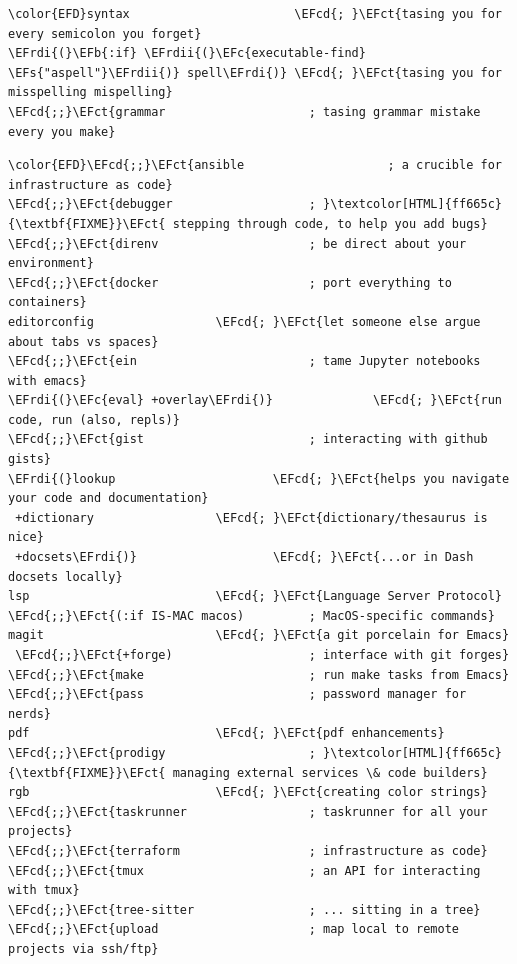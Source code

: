\documentclass{scrartcl}
\newcommand{\EFs}[1]{\textcolor{EFs}{#1}} %
\newcommand{\EFb}[1]{\textcolor{EFb}{#1}} %
\newcommand{\EFct}[1]{\textcolor{EFct}{#1}} %
\newcommand{\EFc}[1]{\textcolor{EFc}{#1}} %
\newcommand{\EFcd}[1]{\textcolor{EFcd}{#1}} %
\newcommand{\EFrdi}[1]{#1} %
\newcommand{\EFrdii}[1]{#1} %
\begin{document}
\begin{enumerate}
\begin{Code}
\begin{Verbatim}[]
\color{EFD}syntax                       \EFcd{; }\EFct{tasing you for every semicolon you forget}
\EFrdi{(}\EFb{:if} \EFrdii{(}\EFc{executable-find} \EFs{"aspell"}\EFrdii{)} spell\EFrdi{)} \EFcd{; }\EFct{tasing you for misspelling mispelling}
\EFcd{;;}\EFct{grammar                    ; tasing grammar mistake every you make}
\end{Verbatim}
\end{Code}

\begin{Code}
\begin{Verbatim}[]
\color{EFD}\EFcd{;;}\EFct{ansible                    ; a crucible for infrastructure as code}
\EFcd{;;}\EFct{debugger                   ; }\textcolor[HTML]{ff665c}{\textbf{FIXME}}\EFct{ stepping through code, to help you add bugs}
\EFcd{;;}\EFct{direnv                     ; be direct about your environment}
\EFcd{;;}\EFct{docker                     ; port everything to containers}
editorconfig                 \EFcd{; }\EFct{let someone else argue about tabs vs spaces}
\EFcd{;;}\EFct{ein                        ; tame Jupyter notebooks with emacs}
\EFrdi{(}\EFc{eval} +overlay\EFrdi{)}              \EFcd{; }\EFct{run code, run (also, repls)}
\EFcd{;;}\EFct{gist                       ; interacting with github gists}
\EFrdi{(}lookup                      \EFcd{; }\EFct{helps you navigate your code and documentation}
 +dictionary                 \EFcd{; }\EFct{dictionary/thesaurus is nice}
 +docsets\EFrdi{)}                   \EFcd{; }\EFct{...or in Dash docsets locally}
lsp                          \EFcd{; }\EFct{Language Server Protocol}
\EFcd{;;}\EFct{(:if IS-MAC macos)         ; MacOS-specific commands}
magit                        \EFcd{; }\EFct{a git porcelain for Emacs}
 \EFcd{;;}\EFct{+forge)                   ; interface with git forges}
\EFcd{;;}\EFct{make                       ; run make tasks from Emacs}
\EFcd{;;}\EFct{pass                       ; password manager for nerds}
pdf                          \EFcd{; }\EFct{pdf enhancements}
\EFcd{;;}\EFct{prodigy                    ; }\textcolor[HTML]{ff665c}{\textbf{FIXME}}\EFct{ managing external services \& code builders}
rgb                          \EFcd{; }\EFct{creating color strings}
\EFcd{;;}\EFct{taskrunner                 ; taskrunner for all your projects}
\EFcd{;;}\EFct{terraform                  ; infrastructure as code}
\EFcd{;;}\EFct{tmux                       ; an API for interacting with tmux}
\EFcd{;;}\EFct{tree-sitter                ; ... sitting in a tree}
\EFcd{;;}\EFct{upload                     ; map local to remote projects via ssh/ftp}
\end{Verbatim}
\end{Code}


\end{enumerate}
\end{document}
